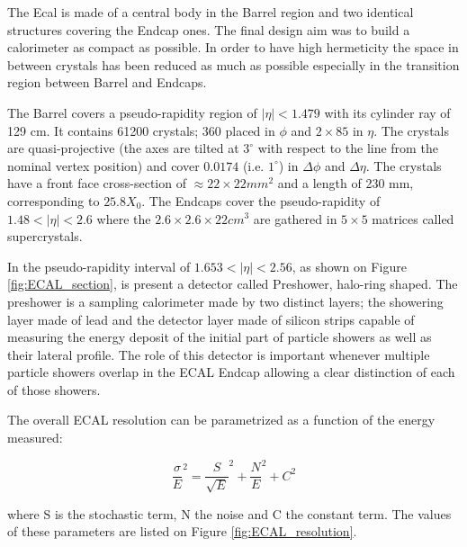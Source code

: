 The Ecal is made of a central body in the Barrel region and two identical structures covering the Endcap ones. The final design aim was to build a calorimeter as compact as possible. In order to have high hermeticity the space in between crystals has been reduced as much as possible especially in the transition region between Barrel and Endcaps. 

The Barrel covers a pseudo-rapidity region of $|\eta| < 1.479$ with its cylinder ray of 129 cm. It contains 61200 crystals; 360 placed in $\phi$ and $2\times85$ in $\eta$. The crystals are quasi-projective (the axes are tilted at $3^{\circ}$ with respect to the line from the nominal vertex position) and cover $0.0174$ (i.e. $1^{\circ}$) in $\Delta\phi$ and $\Delta\eta$. The crystals have a front face cross-section of $\approx 22\times22 mm^{2}$ and a length of 230 mm, corresponding to $25.8 X_{0}$. The Endcaps cover the pseudo-rapidity of $1.48 < |\eta| < 2.6$ where the $2.6\times2.6\times22 cm^{3}$ are gathered in $5\times5$ matrices called supercrystals.

In the pseudo-rapidity interval of $1.653 < |\eta| < 2.56$, as shown on Figure \ref{fig:ECAL_section}, is present a detector called Preshower, halo-ring shaped. The preshower is a sampling calorimeter made by two distinct layers; the showering layer made of lead and the detector layer made of silicon strips capable of measuring the energy deposit of the initial part of particle showers as well as their lateral profile. The role of this detector is important whenever multiple particle showers overlap in the ECAL Endcap allowing a clear distinction of each of those showers.

The overall ECAL resolution can be parametrized as a function of the energy measured:

\begin{equation}
\dfrac{\sigma}{E}^{2} = \dfrac{S}{\sqrt{E}}^{2} + \dfrac{N}{E}^{2} + C^{2}
\end{equation}

where S is the stochastic term, N the noise and C the constant term. The values of these
parameters are listed on Figure \ref{fig:ECAL_resolution}.  

